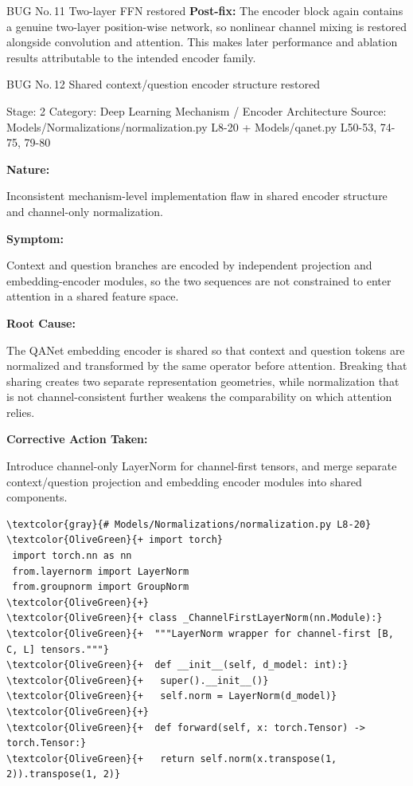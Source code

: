 \documentclass[10pt]{article}
\newcommand{\FieldLabel}[1]{%
 {\bfseries #1:}\par
}
\begin{document}
\begin{bugbox}{BUG No.\,11 \quad Two-layer FFN restored}
\textbf{Post-fix:} The encoder block again contains a genuine two-layer position-wise network, so nonlinear channel mixing is restored alongside convolution and attention. This makes later performance and ablation results attributable to the intended encoder family.
\par
\vspace{0.35em}
\end{bugbox}

\begin{bugbox}{BUG No.\,12 \quad Shared context/question encoder structure restored}
{\color{MetaGray}\small Stage: 2 \;\textbar\; Category: Deep Learning Mechanism / Encoder Architecture \;\textbar\; Source: Models/Normalizations/normalization.py L8-20 + Models/qanet.py L50-53, 74-75, 79-80\par}
\vspace{0.22em}
\FieldLabel{Nature}
Inconsistent mechanism-level implementation flaw in shared encoder structure and channel-only normalization.
\par
\vspace{0.35em}
\FieldLabel{Symptom}
Context and question branches are encoded by independent projection and embedding-encoder modules, so the two sequences are not constrained to enter attention in a shared feature space.
\par
\vspace{0.35em}
\FieldLabel{Root Cause}
The QANet embedding encoder is shared so that context and question tokens are normalized and transformed by the same operator before attention. Breaking that sharing creates two separate representation geometries, while normalization that is not channel-consistent further weakens the comparability on which attention relies.
\par
\vspace{0.35em}
\FieldLabel{Corrective Action Taken}
Introduce channel-only LayerNorm for channel-first tensors, and merge separate context/question projection and embedding encoder modules into shared components.
\par
\vspace{0.35em}
\begin{Verbatim}[commandchars=\\\{\},fontsize=\footnotesize,breaklines=true,breaksymbol={},frame=leftline,framerule=2pt,rulecolor=\color{gray!40},xleftmargin=6pt,formatcom=\singlespacing]
\textcolor{gray}{# Models/Normalizations/normalization.py L8-20}
\textcolor{OliveGreen}{+ import torch}
 import torch.nn as nn
 from.layernorm import LayerNorm
 from.groupnorm import GroupNorm
\textcolor{OliveGreen}{+}
\textcolor{OliveGreen}{+ class _ChannelFirstLayerNorm(nn.Module):}
\textcolor{OliveGreen}{+  """LayerNorm wrapper for channel-first [B, C, L] tensors."""}
\textcolor{OliveGreen}{+  def __init__(self, d_model: int):}
\textcolor{OliveGreen}{+   super().__init__()}
\textcolor{OliveGreen}{+   self.norm = LayerNorm(d_model)}
\textcolor{OliveGreen}{+}
\textcolor{OliveGreen}{+  def forward(self, x: torch.Tensor) -> torch.Tensor:}
\textcolor{OliveGreen}{+   return self.norm(x.transpose(1, 2)).transpose(1, 2)}
 

\end{Verbatim}
\end{bugbox}
\end{document}
